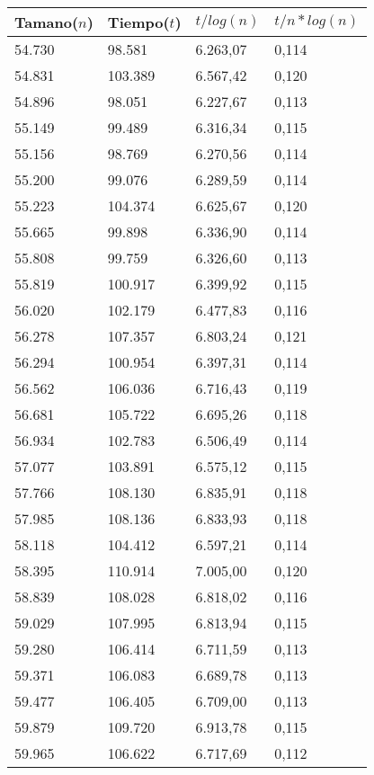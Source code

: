 \begin{table}[H]
\parbox{0.3\textwidth}{
  \begin{tabular}{| l | l | l |l |}
    \hline
    Tamano($n$) & Tiempo($t$) & $t / log(n)$ & $t / n*log(n)$ \\ \hline
54.730	&	98.581	&	6.263,07	&	0,114	\\ \hline
54.831	&	103.389	&	6.567,42	&	0,120	\\ \hline
54.896	&	98.051	&	6.227,67	&	0,113	\\ \hline
55.149	&	99.489	&	6.316,34	&	0,115	\\ \hline
55.156	&	98.769	&	6.270,56	&	0,114	\\ \hline
55.200	&	99.076	&	6.289,59	&	0,114	\\ \hline
55.223	&	104.374	&	6.625,67	&	0,120	\\ \hline
55.665	&	99.898	&	6.336,90	&	0,114	\\ \hline
55.808	&	99.759	&	6.326,60	&	0,113	\\ \hline
55.819	&	100.917	&	6.399,92	&	0,115	\\ \hline
56.020	&	102.179	&	6.477,83	&	0,116	\\ \hline
56.278	&	107.357	&	6.803,24	&	0,121	\\ \hline
56.294	&	100.954	&	6.397,31	&	0,114	\\ \hline
56.562	&	106.036	&	6.716,43	&	0,119	\\ \hline
56.681	&	105.722	&	6.695,26	&	0,118	\\ \hline
56.934	&	102.783	&	6.506,49	&	0,114	\\ \hline
57.077	&	103.891	&	6.575,12	&	0,115	\\ \hline
57.766	&	108.130	&	6.835,91	&	0,118	\\ \hline
57.985	&	108.136	&	6.833,93	&	0,118	\\ \hline
58.118	&	104.412	&	6.597,21	&	0,114	\\ \hline
58.395	&	110.914	&	7.005,00	&	0,120	\\ \hline
58.839	&	108.028	&	6.818,02	&	0,116	\\ \hline
59.029	&	107.995	&	6.813,94	&	0,115	\\ \hline
59.280	&	106.414	&	6.711,59	&	0,113	\\ \hline
59.371	&	106.083	&	6.689,78	&	0,113	\\ \hline
59.477	&	106.405	&	6.709,00	&	0,113	\\ \hline
59.879	&	109.720	&	6.913,78	&	0,115	\\ \hline
59.965	&	106.622	&	6.717,69	&	0,112	\\ \hline

\end{tabular}}
\end{table}
